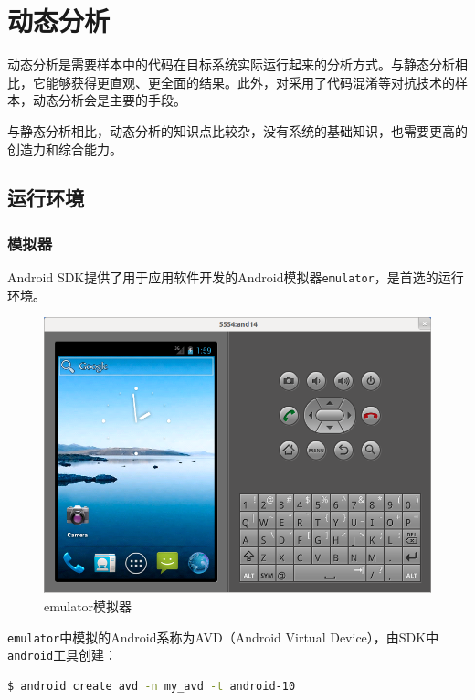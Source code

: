 \chapter{动态分析}
动态分析是需要样本中的代码在目标系统实际运行起来的分析方式。与静态分析相比，它能够获得更直观、更全面的结果。此外，对采用了代码混淆等对抗技术的样本，动态分析会是主要的手段。

与静态分析相比，动态分析的知识点比较杂，没有系统的基础知识，也需要更高的创造力和综合能力。

\section{运行环境}
\subsection{模拟器}
Android SDK提供了用于应用软件开发的Android模拟器\lstinline!emulator!\cite{url:android_emulator}，是首选的运行环境。
\begin{figure}[htbp]
  \centering
  \includegraphics[width=14cm]{image/emulator.png}
  \caption{emulator模拟器}
\end{figure}

\lstinline!emulator!中模拟的Android系称为AVD（Android Virtual Device），由SDK中\lstinline!android!\cite{url:android_android}工具创建：
\begin{lstlisting}[language=bash, numbers=none]
 $ android create avd -n my_avd -t android-10
\end{lstlisting}

